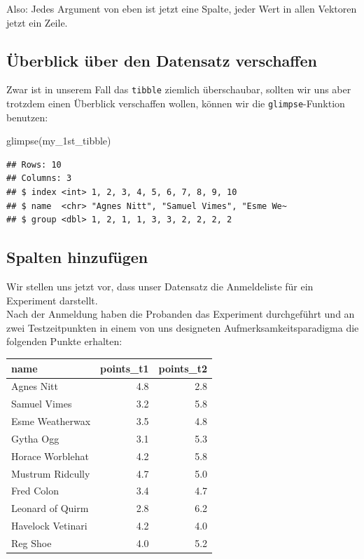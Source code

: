 \documentclass[
]{book}
\newenvironment{Shaded}{\begin{snugshade}}{\end{snugshade}}
\newcommand{\FunctionTok}[1]{\textcolor[rgb]{0.00,0.00,0.00}{#1}}
\newcommand{\NormalTok}[1]{#1}
\begin{document}
Also: Jedes Argument von eben ist jetzt eine Spalte, jeder Wert in allen Vektoren jetzt ein Zeile.

\hypertarget{uxfcberblick-uxfcber-den-datensatz-verschaffen}{%
\subsection{Überblick über den Datensatz verschaffen}\label{uxfcberblick-uxfcber-den-datensatz-verschaffen}}

Zwar ist in unserem Fall das \texttt{tibble} ziemlich überschaubar, sollten wir uns aber trotzdem einen Überblick verschaffen wollen, können wir die \texttt{glimpse}-Funktion benutzen:

\begin{Shaded}
\begin{Highlighting}[]
\FunctionTok{glimpse}\NormalTok{(my\_1st\_tibble)}
\end{Highlighting}
\end{Shaded}

\begin{verbatim}
## Rows: 10
## Columns: 3
## $ index <int> 1, 2, 3, 4, 5, 6, 7, 8, 9, 10
## $ name  <chr> "Agnes Nitt", "Samuel Vimes", "Esme We~
## $ group <dbl> 1, 2, 1, 1, 3, 3, 2, 2, 2, 2
\end{verbatim}

\hypertarget{spalten-hinzufuxfcgen}{%
\subsection{Spalten hinzufügen}\label{spalten-hinzufuxfcgen}}

Wir stellen uns jetzt vor, dass unser Datensatz die Anmeldeliste für ein Experiment darstellt.\\
Nach der Anmeldung haben die Probanden das Experiment durchgeführt und an zwei Testzeitpunkten in einem von uns designeten Aufmerksamkeitsparadigma die folgenden Punkte erhalten:

\begin{table}
\centering
\begin{tabular}[t]{l|r|r}
\hline
name & points\_t1 & points\_t2\\
\hline
Agnes Nitt & 4.8 & 2.8\\
\hline
Samuel Vimes & 3.2 & 5.8\\
\hline
Esme Weatherwax & 3.5 & 4.8\\
\hline
Gytha Ogg & 3.1 & 5.3\\
\hline
Horace Worblehat & 4.2 & 5.8\\
\hline
Mustrum Ridcully & 4.7 & 5.0\\
\hline
Fred Colon & 3.4 & 4.7\\
\hline
Leonard of Quirm & 2.8 & 6.2\\
\hline
Havelock Vetinari & 4.2 & 4.0\\
\hline
Reg Shoe & 4.0 & 5.2\\
\hline
\end{tabular}
\end{table}
\end{document}

